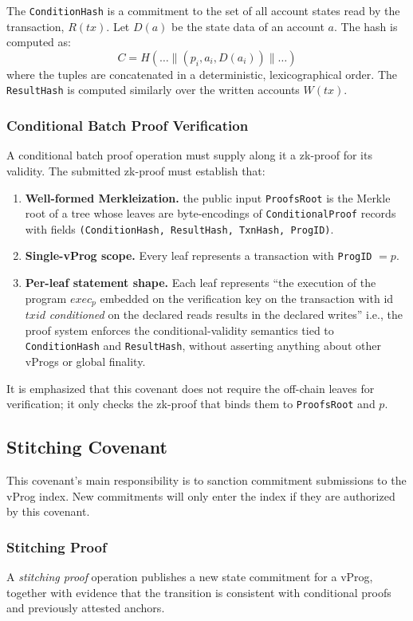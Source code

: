 \documentclass[onecolumn, 9pt, a4paper]{extarticle}
\begin{document}
The \texttt{ConditionHash} is a commitment to the set of all account states read by the transaction, $R(tx)$. Let $D(a)$ be the state data of an account $a$. The hash is computed as:
\begin{equation}
C = H(\dots \mathbin{\|} (p_i, a_i, D(a_i)) \mathbin{\|} \dots)
\end{equation}
where the tuples are concatenated in a deterministic, lexicographical order. The \texttt{ResultHash} is computed similarly over the written accounts $W(tx)$.

\subsubsection{Conditional Batch Proof Verification}
A conditional batch proof operation must supply along it a zk-proof for its validity.
The submitted zk-proof must establish that:
\begin{enumerate}
  \item \textbf{Well-formed Merkleization.} the public input \texttt{ProofsRoot} is the Merkle root of a tree whose leaves are byte-encodings of \texttt{ConditionalProof} records with fields \texttt{(ConditionHash, ResultHash, TxnHash, ProgID)}.
  \item \textbf{Single-vProg scope.} Every leaf represents a transaction with \texttt{ProgID} $= p$.
  \item \textbf{Per-leaf statement shape.} Each leaf represents “the execution of the program $exec_p$ embedded on the verification key on the transaction with id $txid$ \emph{conditioned} on the declared reads results in the declared writes” i.e., the proof system enforces the conditional-validity semantics tied to \texttt{ConditionHash} and \texttt{ResultHash}, without asserting anything about other vProgs or global finality.
\end{enumerate}
It is emphasized that this covenant does not require the off-chain leaves for verification; it only checks the zk-proof that binds them to \texttt{ProofsRoot} and $p$.


\subsection{Stitching Covenant}\label{sec:vprog_covenant}
This covenant's main responsibility is to sanction commitment submissions to the vProg index. New commitments will only enter the index if they are authorized by this covenant.

\subsubsection{Stitching Proof}\label{sec:stitching_proof_operation}
A \emph{stitching proof} operation publishes a new state commitment for a vProg, together with evidence that the transition is consistent with conditional proofs and previously attested anchors.
\end{document}
